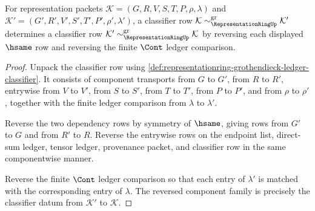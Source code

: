 \begin{theorem}
\label{thm:representationring-grothendieck-classifier-symmetric}
For representation packets
$\mathcal{K}=(G,R,V,S,T,P,\rho,\lambda)$ and
$\mathcal{K}'=(G',R',V',S',T',P',\rho',\lambda')$, a classifier row
$\mathcal{K}\sim_{\RepresentationRingUp}^{\mathrm{gr}}\mathcal{K}'$ determines
a classifier row
$\mathcal{K}'\sim_{\RepresentationRingUp}^{\mathrm{gr}}\mathcal{K}$ by
reversing each displayed $\hsame$ row and reversing the finite $\Cont$ ledger
comparison.
\end{theorem}
\begin{proof}
Unpack the classifier row using
\autoref{def:representationring-grothendieck-ledger-classifier}. It consists
of component transports from $G$ to $G'$, from $R$ to $R'$, entrywise from
$V$ to $V'$, from $S$ to $S'$, from $T$ to $T'$, from $P$ to $P'$, and from
$\rho$ to $\rho'$, together with the finite ledger comparison from $\lambda$
to $\lambda'$.

Reverse the two dependency rows by symmetry of $\hsame$, giving rows from
$G'$ to $G$ and from $R'$ to $R$. Reverse the entrywise rows on the endpoint
list, direct-sum ledger, tensor ledger, provenance packet, and classifier
row in the same componentwise manner.

Reverse the finite $\Cont$ ledger comparison so that each entry of
$\lambda'$ is matched with the corresponding entry of $\lambda$. The reversed
component family is precisely the classifier datum from $\mathcal{K}'$ to
$\mathcal{K}$.
\end{proof}

